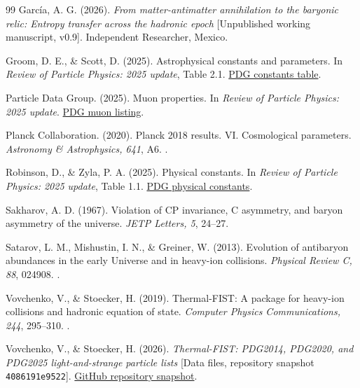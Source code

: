\begin{thebibliography}{99}
García, A. G. (2026).
\emph{From matter-antimatter annihilation to the baryonic relic: Entropy transfer across the hadronic epoch}
[Unpublished working manuscript, v0.9]. Independent Researcher, Mexico.

Groom, D. E., \& Scott, D. (2025).
Astrophysical constants and parameters. In \emph{Review of Particle Physics: 2025 update}, Table 2.1.
\href{https://pdg.lbl.gov/2025/reviews/rpp2025-rev-astrophysical-constants.pdf}{PDG constants table}.

Particle Data Group. (2025).
Muon properties. In \emph{Review of Particle Physics: 2025 update}.
\href{https://pdg.lbl.gov/2025/listings/rpp2025-list-muon.pdf}{PDG muon listing}.

Planck Collaboration. (2020).
Planck 2018 results. VI. Cosmological parameters.
\emph{Astronomy \& Astrophysics, 641}, A6.
.

Robinson, D., \& Zyla, P. A. (2025).
Physical constants. In \emph{Review of Particle Physics: 2025 update}, Table 1.1.
\href{https://pdg.lbl.gov/2025/reviews/rpp2025-rev-phys-constants.pdf}{PDG physical constants}.

Sakharov, A. D. (1967).
Violation of CP invariance, C asymmetry, and baryon asymmetry of the universe.
\emph{JETP Letters, 5}, 24--27.

Satarov, L. M., Mishustin, I. N., \& Greiner, W. (2013).
Evolution of antibaryon abundances in the early Universe and in heavy-ion collisions.
\emph{Physical Review C, 88}, 024908.
.

Vovchenko, V., \& Stoecker, H. (2019).
Thermal-FIST: A package for heavy-ion collisions and hadronic equation of state.
\emph{Computer Physics Communications, 244}, 295--310.
.

Vovchenko, V., \& Stoecker, H. (2026).
\emph{Thermal-FIST: PDG2014, PDG2020, and PDG2025 light-and-strange particle lists}
[Data files, repository snapshot \texttt{4086191e9522}].
\href{https://github.com/vlvovch/Thermal-FIST/tree/4086191e952285cd572ba2bbbefb2fdc55401c9b/input/list}{GitHub repository snapshot}.

\end{thebibliography}

